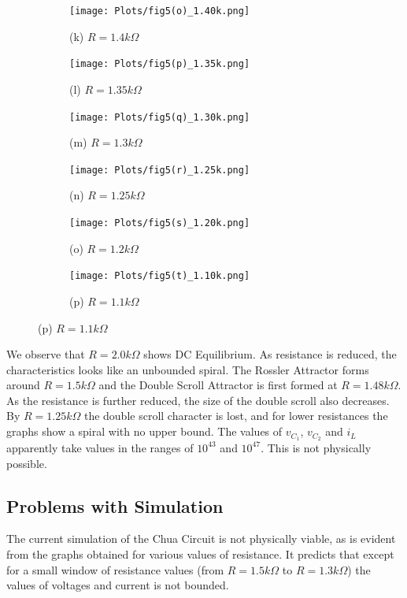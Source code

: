 \documentclass[12pt]{article}
\begin{document}
\begin{figure}[H] %
	\centering
	\begin{subfigure}[b]{0.5\textwidth}
		\centering
		\texttt{[image: Plots/fig5(o)\_1.40k.png]}
		\caption{(k) $R=1.4k\Omega$}
	\end{subfigure}%
	\begin{subfigure}[b]{0.5\textwidth}
		\centering
		\texttt{[image: Plots/fig5(p)\_1.35k.png]}
		\caption{(l) $R=1.35k\Omega$}
	\end{subfigure}
	\begin{subfigure}[b]{0.5\textwidth}
		\centering
		\texttt{[image: Plots/fig5(q)\_1.30k.png]}
		\caption{(m) $R=1.3k\Omega$}
	\end{subfigure}%
	\begin{subfigure}[b]{0.5\textwidth}
		\centering
		\texttt{[image: Plots/fig5(r)\_1.25k.png]}
		\caption{(n) $R=1.25k\Omega$}
	\end{subfigure}
	\begin{subfigure}[b]{0.5\textwidth}
		\centering
		\texttt{[image: Plots/fig5(s)\_1.20k.png]}
		\caption{(o) $R=1.2k\Omega$}
	\end{subfigure}%
	\begin{subfigure}[b]{0.5\textwidth}
		\centering
		\texttt{[image: Plots/fig5(t)\_1.10k.png]}
		\caption{(p) $R=1.1k\Omega$}
	\end{subfigure}
\end{figure}
We observe that $R=2.0 k\Omega$ shows DC Equilibrium. As resistance is reduced, the characteristics looks like an unbounded spiral. \linebreak
The Rossler Attractor forms around $R=1.5 k\Omega$ and the Double Scroll Attractor is first formed at $R=1.48k\Omega$. As the resistance is further reduced, the size of the double scroll also decreases. \linebreak
By $R=1.25k\Omega$ the double scroll character is lost, and for lower resistances the graphs show a spiral with no upper bound. The values of $v_{C_1}$, $v_{C_2}$ and $i_L$ apparently take values in the ranges of $10^{43}$ and $10^{47}$. This is not physically possible.
%
\subsection{Problems with Simulation}
The current simulation of the Chua Circuit is not physically viable, as is evident from the graphs obtained for various values of resistance. It predicts that except for a small window of resistance values (from $R=1.5k\Omega$ to $R=1.3k\Omega$) the values of voltages and current is not bounded. \linebreak
\end{document}
